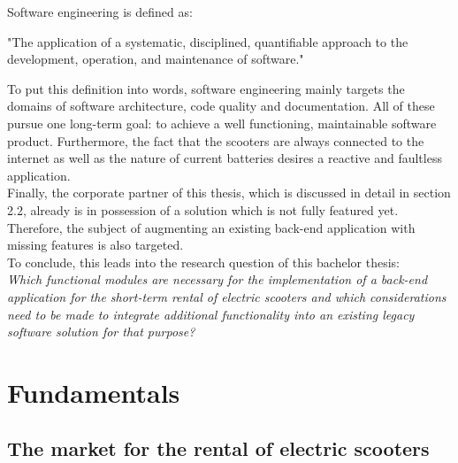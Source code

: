 \documentclass[12pt,a4paper]{report}
\begin{document}
Software engineering is defined as:
\begin{displayquote}
"The application of a systematic, disciplined, quantifiable approach to the
development, operation, and maintenance of software."~\cite{se-ieee}
\end{displayquote}
To put this definition into words, software engineering mainly targets
the domains of software architecture, code quality and documentation.
All of these pursue one long-term goal: to achieve a well functioning, maintainable
software product.
Furthermore, the fact that the scooters are always connected to the internet
as well as the nature of current batteries desires a reactive and faultless application.\\
Finally, the corporate partner of this thesis, which is discussed in detail in section 2.2,
already is in possession of a solution which is not fully featured yet.
Therefore, the subject of augmenting an existing back-end application with missing features is also targeted.\\
To conclude, this leads into the research question of this bachelor thesis:\\
\emph{Which functional modules are necessary for the implementation of a back-end application
for the short-term rental of electric scooters and which considerations need to be made
to integrate additional functionality into an existing legacy software solution for that purpose?}



\chapter{Fundamentals} \label{chap:fundamentals}


\section{The market for the rental of electric scooters}
\end{document}

